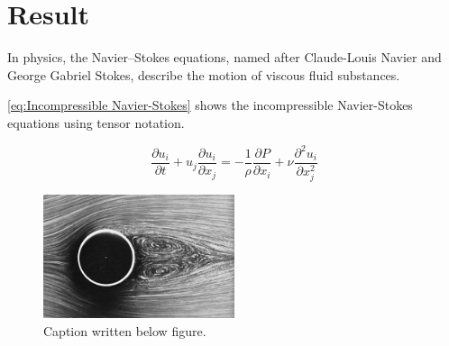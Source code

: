 \section{Result}

In physics, the Navier–Stokes equations, named after Claude-Louis Navier and George Gabriel Stokes, describe the motion of viscous fluid substances.

\autoref{eq:Incompressible Navier-Stokes} shows the incompressible Navier-Stokes equations using tensor notation.

\begin{equation}
    \frac{\partial u_i}{\partial t} + u_j \frac{\partial u_i}{\partial x_j} = -\frac{1}{\rho} \frac{\partial P}{\partial x_i} + \nu \frac{\partial^2 u_i}{\partial x_j^2}
    \label{eq:Incompressible Navier-Stokes}
\end{equation}

\begin{figure}[H]
    \centering
    \includegraphics[width=0.5\textwidth]{Images/CylinderImage.jpg}
    \caption[Caption used in list of tables]{Caption written below figure.}
    \label{fig:flow around cylinder}
\end{figure}

